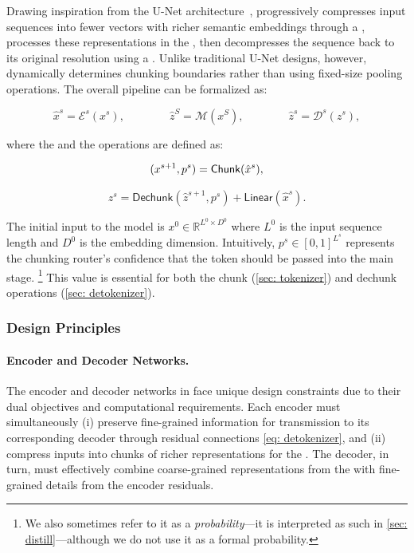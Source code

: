 Drawing inspiration from the U-Net architecture~\citep{U-Net}, \model{} progressively compresses input sequences into fewer vectors with richer semantic embeddings through a \chunk{}, processes these representations in the \main{}, then decompresses the sequence back to its original resolution using a \dechunk{}.
Unlike traditional U-Net designs, however, \model{} dynamically determines chunking boundaries rather than using fixed-size pooling operations.
The overall pipeline can be formalized as:

\begin{equation}
    \label{eq: stages}
    \hat{x}^{s} = \mathcal{E}^{s}(x^{s}), \qquad\qquad \hat{z}^S = \mathcal{M}(x^S), \qquad\qquad \hat{z}^{s} = \mathcal{D}^{s}(z^{s}),
\end{equation}

where the \chunk{} and the \dechunk{} operations are defined as:

\begin{minipage}[t]{.45\linewidth}
  \begin{equation}
    \label{eq: tokenizer}
    (x^{s+1},\space p^{s}) = \mathsf{Chunk}(\hat{x}^s),
  \end{equation}
\end{minipage}
\begin{minipage}[t]{.55\linewidth}
  \begin{equation}
    \label{eq: detokenizer}
    z^{s} = \mathsf{Dechunk}(\hat{z}^{s+1}, p^{s}) + \mathsf{Linear}(\hat{x}^{s}).
  \end{equation}
\end{minipage}



The initial input to the model is $x^0 \in \mathbb{R}^{L^0 \times D^0}$ where $L^0$ is the input sequence length and $D^0$ is the embedding dimension.
Intuitively, $p^{s} \in [0,1]^{L^s}$ represents the chunking router's confidence that the token should be passed into the main stage.
\footnote{We also sometimes refer to it as a \emph{probability}---it is interpreted as such in \cref{sec: distill}---although we do not use it as a formal probability.}
This value is essential for both the chunk (\cref{sec: tokenizer}) and dechunk operations (\cref{sec: detokenizer}).

\subsubsection{Design Principles}

\paragraph{Encoder and Decoder Networks.}
The encoder and decoder networks in \model{} face unique design constraints due to their dual objectives and computational requirements.
Each encoder must simultaneously (i) preserve fine-grained information for transmission to its corresponding decoder through residual connections \eqref{eq: detokenizer}, and (ii) compress inputs into chunks of richer representations for the \main{}.
The decoder, in turn, must effectively combine coarse-grained representations from the \main{} with fine-grained details from the encoder residuals.

